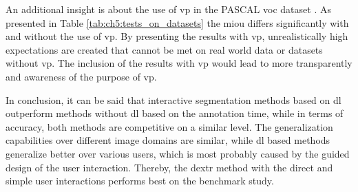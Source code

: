 An additional insight is about the use of \gls{vp} in the PASCAL \gls{voc} dataset \cite{Eve20-PascalVOC}.
As presented in Table \ref{tab:ch5:tests_on_datasets} the \gls{miou} differs significantly with and without the use of \gls{vp}.
By presenting the results with \gls{vp}, unrealistically high expectations are created that cannot be met on real world data or datasets without \gls{vp}.
The inclusion of the results with \gls{vp} would lead to more transparently and awareness of the purpose of \gls{vp}.

In conclusion, it can be said that interactive segmentation methods based on \gls{dl} outperform  methods without \gls{dl} based on the annotation time, while in terms of accuracy, both methods are competitive on a similar level.
The generalization capabilities over different image domains are similar, while \gls{dl} based methods generalize better over various users, which is most probably caused by the guided design of the user interaction.
Thereby, the \gls{dextr} method with the direct and simple user interactions performs best on the benchmark study.


 